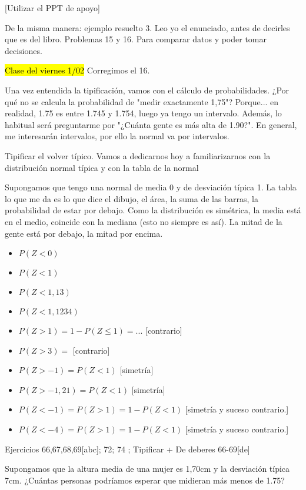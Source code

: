 [Utilizar el PPT de apoyo]


De la misma manera: ejemplo resuelto 3. Leo yo el enunciado, antes de decirles que es del libro. Problemas 15 y 16. Para comparar datos y poder tomar decisiones. 


\hl{Clase del viernes 1/02}
Corregimos el 16.

Una vez entendida la tipificación, vamos con el cálculo de probabilidades. ¿Por qué no se calcula la probabilidad de "medir exactamente 1,75"? Porque... en realidad, 1.75 es entre 1.745 y 1.754, luego ya tengo un intervalo. 
Además, lo habitual será preguntarme por "¿Cuánta gente es más alta de 1.90?". En general, me interesarán intervalos, por ello la normal va por intervalos.

Tipificar el volver típico. Vamos a dedicarnos hoy a familiarizarnos con la distribución normal típica y con la tabla de la normal

Supongamos que tengo una normal de media 0 y de desviación típica 1. La tabla lo que me da es lo que dice el dibujo, el área, la suma de las barras, la probabilidad de estar por debajo. Como la distribución es simétrica, la media está en el medio, coincide con la mediana (esto no siempre es así). La mitad de la gente está por debajo, la mitad por encima.

\begin{itemize}
	\item $P(Z<0)$
	\item $P(Z<1)$
	\item $P(Z<1,13)$
	\item $P(Z<1,1234)$
	\item $P(Z > 1) = 1 - P(Z\leq 1) = ...$ [contrario]
	\item $P(Z > 3) = $ [contrario]
	\item $P(Z  > -1) = P(Z < 1)$ [simetría]
	\item $P(Z  > -1,21) = P(Z < 1)$ [simetría]
	\item $P(Z  < -1) = P(Z > 1) = 1 - P(Z<1)$ [simetría y suceso contrario.]
	\item $P(Z  < -4) = P(Z > 1) = 1 - P(Z<1)$ [simetría y suceso contrario.]
\end{itemize}

Ejercicios 66,67,68,69[abc]; 72; 74 ; Tipificar + De deberes 66-69[de]

Supongamos que la altura media de una mujer es 1,70cm y la desviación típica 7cm. ¿Cuántas personas podríamos esperar que midieran más menos de 1.75?

